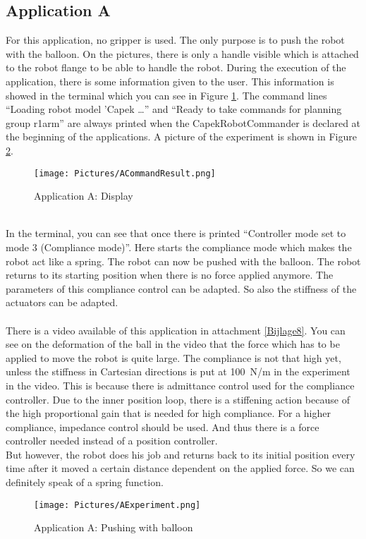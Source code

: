 \documentclass[11pt,a4paper]{report}
\begin{document}
\subsection{Application A}
For this application, no gripper is used. The only purpose is to push the robot with the balloon. On the pictures, there is only a handle visible which is attached to the robot flange to be able to handle the robot. During the execution of the application, there is some information given to the user. This information is showed in the terminal which you can see in Figure \ref{fig:ACommandResult}. The command lines ``Loading robot model 'Capek \ldots '' and ``Ready to take commands for planning group r1\textunderscore arm'' are always printed when the CapekRobotCommander is declared at the beginning of the applications. A picture of the experiment is shown in Figure \ref{fig:AExperiment}.
\begin{figure}[!ht]
	\centering
	\texttt{[image: Pictures/ACommandResult.png]}
	\caption{Application A: Display}
	\label{fig:ACommandResult}
\end{figure}
\\
In the terminal, you can see that once there is printed ``Controller mode set to mode 3 (Compliance mode)''. Here starts the compliance mode which makes the robot act like a spring. The robot can now be pushed with the balloon. The robot returns to its starting position when there is no force applied anymore. The parameters of this compliance control can be adapted. So also the stiffness of the actuators can be adapted.\\\\
There is a video available of this application in attachment \ref{Bijlage8}.
You can see on the deformation of the ball in the video that the force which has to be applied to move the robot is quite large. The compliance is not that high yet, unless the stiffness in Cartesian directions is put at 100~N/m in the experiment in the video. This is because there is admittance control used for the compliance controller. Due to the inner position loop, there is a stiffening action because of the high proportional gain that is needed for high compliance. For a higher compliance, impedance control should be used. And thus there is a force controller needed instead of a position controller.\\
But however, the robot does his job and returns back to its initial position every time after it moved a certain distance dependent on the applied force. So we can definitely speak of a spring function.
\begin{figure}[!ht]
	\centering
	\texttt{[image: Pictures/AExperiment.png]}
	\caption{Application A: Pushing with balloon}
	\label{fig:AExperiment}
\end{figure}
\newpage
\end{document}
